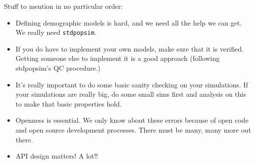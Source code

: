 \documentclass{article}
\newcommand{\stdpopsim}[0]{\texttt{stdpopsim}}
\begin{document}
Stuff to mention in no particular order:
\begin{itemize}
\item Defining demographic models is hard, and we need all the help we can get.
   We really need \stdpopsim.
\item If you do have to implement your own models, make sure that it is
verified. Getting someone else to implement it is a good approach (following
stdpopsim's QC procedure.)
\item It's really important to do some basic sanity checking on your
simulations. If your simulations are really big, do some small sims first and
analysis on this to make that basic properties hold.
\item Openness is essential. We only know about these errors because of
open code and open source development processes. There must be many, many more
out there.
\item API design matters! A lot!!
\end{itemize}



\end{document}
